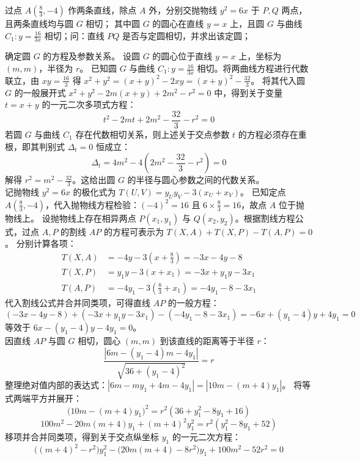 \begin{example}
过点 \(A\left(\frac{8}{3}, -4\right)\) 作两条直线，除点 \(A\) 外，分别交抛物线 \(y^2 = 6x\) 于 \(P,Q\) 两点，且两条直线均与圆 \(G\) 相切；
其中圆 \(G\) 的圆心在直线 \(y = x\) 上，且圆 \(G\) 与曲线 \(C_1: y = \frac{16}{3x}\) 相切；问：直线 \(PQ\) 是否与定圆相切，并求出该定圆；
\end{example}
\begin{solution}
确定圆 $G$ 的方程及参数关系。
设圆 $G$ 的圆心位于直线 $y=x$ 上，坐标为 $(m, m)$，半径为 $r$。
已知圆 $G$ 与曲线 $C_1: y = \frac{16}{3x}$ 相切。将两曲线方程进行代数联立，由 $xy = \frac{16}{3}$ 得 $x^2+y^2 = (x+y)^2 - 2xy = (x+y)^2 - \frac{32}{3}$。
将其代入圆 $G$ 的一般展开式 $x^2+y^2 - 2m(x+y) + 2m^2 - r^2 = 0$ 中，得到关于变量 $t = x+y$ 的一元二次多项式方程：
$$ t^2 - 2mt + 2m^2 - \frac{32}{3} - r^2 = 0 $$
若圆 $G$ 与曲线 $C_1$ 存在代数相切关系，则上述关于交点参数 $t$ 的方程必须存在重根，即其判别式 $\Delta_t = 0$ 恒成立：
$$ \Delta_t = 4m^2 - 4\left(2m^2 - \frac{32}{3} - r^2\right) = 0 $$
解得 $r^2 = m^2 - \frac{32}{3}$。这给出圆 $G$ 的半径与圆心参数之间的代数关系。\\
记抛物线 $y^2 = 6x$ 的极化式为 $T(U, V) = y_U y_V - 3(x_U + x_V)$。
已知定点 $A\left(\frac{8}{3}, -4\right)$，代入抛物线方程检验：$(-4)^2 = 16$ 且 $6 \times \frac{8}{3} = 16$，故点 $A$ 位于抛物线上。
设抛物线上存在相异两点 $P(x_1, y_1)$ 与 $Q(x_2, y_2)$。根据割线方程公式，过点 $A, P$ 的割线 $AP$ 的方程可表示为 $T(X, A) + T(X, P) - T(A, P) = 0$。
分别计算各项：
\begin{align*}
T(X, A) &= -4y - 3\left(x + \frac{8}{3}\right) = -3x - 4y - 8 \\
T(X, P) &= y_1 y - 3(x + x_1) = -3x + y_1 y - 3x_1 \\
T(A, P) &= -4y_1 - 3\left(\frac{8}{3} + x_1\right) = -4y_1 - 8 - 3x_1
\end{align*}
代入割线公式并合并同类项，可得直线 $AP$ 的一般方程：
$$ (-3x - 4y - 8) + (-3x + y_1 y - 3x_1) - (-4y_1 - 8 - 3x_1) = -6x + (y_1 - 4)y + 4y_1 = 0 $$
等效于 $6x - (y_1 - 4)y - 4y_1 = 0$。\\
因直线 $AP$ 与圆 $G$ 相切，圆心 $(m, m)$ 到该直线的距离等于半径 $r$：
$$ \frac{|6m - (y_1 - 4)m - 4y_1|}{\sqrt{36 + (y_1 - 4)^2}} = r $$
整理绝对值内部的表达式：$|6m - m y_1 + 4m - 4y_1| = |10m - (m + 4)y_1|$。
将等式两端平方并展开：
$$ \big(10m - (m + 4)y_1\big)^2 = r^2(36 + y_1^2 - 8y_1 + 16) $$
$$ 100m^2 - 20m(m + 4)y_1 + (m + 4)^2 y_1^2 = r^2(y_1^2 - 8y_1 + 52) $$
移项并合并同类项，得到关于交点纵坐标 $y_1$ 的一元二次方程：
$$ \big((m + 4)^2 - r^2\big)y_1^2 - \big(20m(m + 4) - 8r^2\big)y_1 + 100m^2 - 52r^2 = 0 $$

\end{solution}
